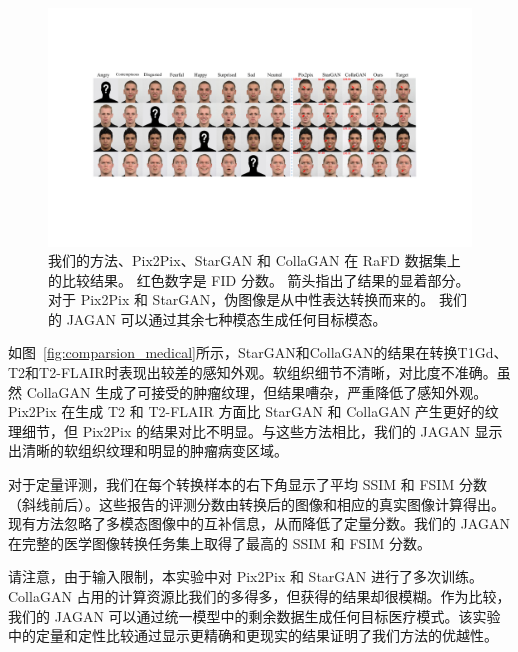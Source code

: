  \begin{figure}
	\begin{center}
		\includegraphics[width=1\columnwidth]{figures/JAGAN/comparsion_facial.pdf}
	\end{center}
	\caption{我们的方法、Pix2Pix、StarGAN 和 CollaGAN 在 RaFD 数据集上的比较结果。 红色数字是 FID 分数。 箭头指出了结果的显着部分。 对于 Pix2Pix 和 StarGAN，伪图像是从中性表达转换而来的。 我们的 JAGAN 可以通过其余七种模态生成任何目标模态。}
	\label{fig:comparsion_facial}
\end{figure}

如图~\ref{fig:comparsion_medical}所示，StarGAN和CollaGAN的结果在转换T1Gd、T2和T2-FLAIR时表现出较差的感知外观。软组织细节不清晰，对比度不准确。虽然 CollaGAN 生成了可接受的肿瘤纹理，但结果嘈杂，严重降低了感知外观。 Pix2Pix 在生成 T2 和 T2-FLAIR 方面比 StarGAN 和 CollaGAN 产生更好的纹理细节，但 Pix2Pix 的结果对比不明显。与这些方法相比，我们的 JAGAN 显示出清晰的软组织纹理和明显的肿瘤病变区域。

对于定量评测，我们在每个转换样本的右下角显示了平均 SSIM 和 FSIM 分数（斜线前后）。这些报告的评测分数由转换后的图像和相应的真实图像计算得出。现有方法忽略了多模态图像中的互补信息，从而降低了定量分数。我们的 JAGAN 在完整的医学图像转换任务集上取得了最高的 SSIM 和 FSIM 分数。

请注意，由于输入限制，本实验中对 Pix2Pix 和 StarGAN 进行了多次训练。 CollaGAN 占用的计算资源比我们的多得多，但获得的结果却很模糊。作为比较，我们的 JAGAN 可以通过统一模型中的剩余数据生成任何目标医疗模式。该实验中的定量和定性比较通过显示更精确和更现实的结果证明了我们方法的优越性。

